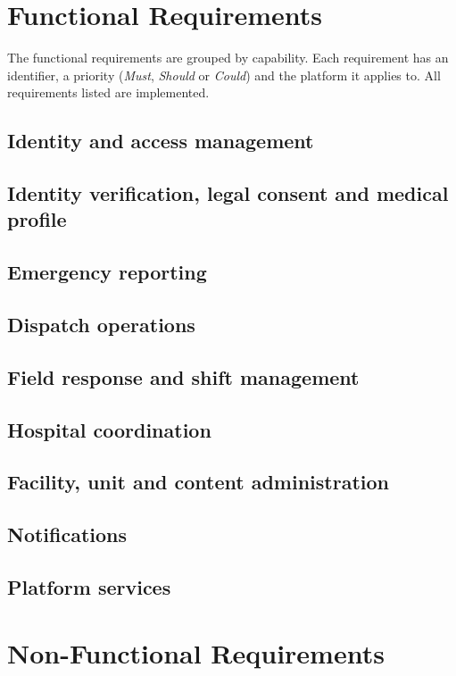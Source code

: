 \section{Functional Requirements}\label{sec:fr}

The functional requirements are grouped by capability. Each requirement has an identifier, a priority
(\emph{Must}, \emph{Should} or \emph{Could}) and the platform it applies to. All requirements listed are
implemented.

\subsection{Identity and access management}

\subsection{Identity verification, legal consent and medical profile}

\subsection{Emergency reporting}

\subsection{Dispatch operations}

\subsection{Field response and shift management}

\subsection{Hospital coordination}

\subsection{Facility, unit and content administration}

\subsection{Notifications}

\subsection{Platform services}


\section{Non-Functional Requirements}\label{sec:nfr}

